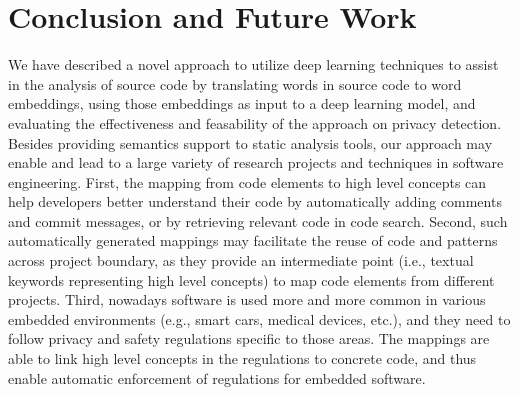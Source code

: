 \section{Conclusion and Future Work}

We have described a novel approach to utilize deep learning techniques to assist in the analysis of source code by translating words in source code to word embeddings, using those embeddings as input to a deep learning model, and evaluating the effectiveness and feasability of the approach on privacy detection. Besides providing semantics support to static analysis tools, our approach may enable and lead to a large variety of research projects and techniques in software engineering. First, the mapping from code elements to high level concepts can help developers better understand their code by automatically adding comments and commit messages, or by retrieving relevant code in code search. Second, such automatically generated mappings may facilitate the reuse of code and patterns across project boundary, as they provide an intermediate point (i.e., textual keywords representing high level concepts) to map code elements from different projects. Third, nowadays software is used more and more common in various embedded environments (e.g., smart cars, medical devices, etc.), and they need to follow privacy and safety regulations specific to those areas. The mappings are able to link high level concepts in the regulations to concrete code, and thus enable automatic enforcement of regulations for embedded software.




